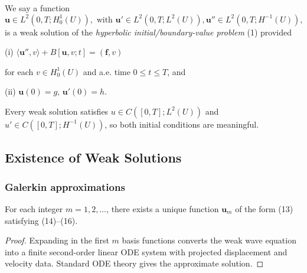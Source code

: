 \begin{definition}
\label{def:weak-solution-hyperbolic-bvp}

We say a function
\[
\mathbf{u} \in L^2(0, T; H^1_0(U)), \text{ with } \mathbf{u}' \in L^2(0, T; L^2(U)), \mathbf{u}'' \in L^2(0, T; H^{-1}(U)),
\]
is a weak solution of the \textit{hyperbolic initial/boundary-value problem} (1) provided

(i) $\langle \mathbf{u}'', v \rangle + B[\mathbf{u}, v; t] = (\mathbf{f}, v)$

for each $v \in H^1_0(U)$ and a.e. time $0 \le t \le T$, and

(ii) $\mathbf{u}(0) = g$, $\mathbf{u}'(0) = h$.
\end{definition}

\begin{remark}
\label{rem:weak-solution-hyperbolic-continuity}

Every weak solution satisfies $u\in C([0,T];L^2(U))$ and $u'\in C([0,T];H^{-1}(U))$, so both initial conditions are meaningful.
\end{remark}

\subsection{Existence of Weak Solutions}

\subsubsection{Galerkin approximations}

\begin{theorem}
\label{thm:hyperbolic-galerkin-approximate-solutions}
For each integer $m = 1, 2, \ldots$, there exists a unique function $\mathbf{u}_m$ of the form (13) satisfying (14)--(16).
\end{theorem}

\begin{proof}
\sketch Expanding in the first $m$ basis functions converts the weak wave equation into a finite second-order linear ODE system with projected displacement and velocity data. Standard ODE theory gives the approximate solution.
\end{proof}

